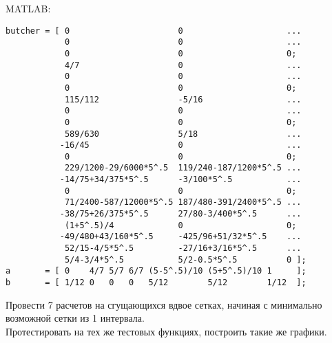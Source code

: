 \begin{enumerate}
\begin{verbatim}
\end{verbatim}
\newpage
MATLAB:
\begin{matlablisting}
	\begin{verbatim}
butcher = [ 0                      0                     ...
            0                      0                     ...
            0                      0                     0;
            4/7                    0                     ...
            0                      0                     ... 
            0                      0                     0;
            115/112                -5/16                 ...  
            0                      0                     ...
            0                      0                     0;
            589/630                5/18                  ...
           -16/45                  0                     ...
            0                      0                     0;
            229/1200-29/6000*5^.5  119/240-187/1200*5^.5 ...
           -14/75+34/375*5^.5      -3/100*5^.5           ...        
            0                      0                     0;
            71/2400-587/12000*5^.5 187/480-391/2400*5^.5 ...
           -38/75+26/375*5^.5      27/80-3/400*5^.5      ...
            (1+5^.5)/4             0                     0;
           -49/480+43/160*5^.5     -425/96+51/32*5^.5    ...   
            52/15-4/5*5^.5         -27/16+3/16*5^.5      ...
            5/4-3/4*5^.5           5/2-0.5*5^.5          0 ];
a       = [ 0    4/7 5/7 6/7 (5-5^.5)/10 (5+5^.5)/10 1     ];
b       = [ 1/12 0   0   0   5/12        5/12        1/12  ];
	\end{verbatim}
\end{matlablisting}

Провести 7 расчетов на сгущающихся вдвое сетках, начиная с минимально возможной сетки из 1 интервала.\\
Протестировать на тех же тестовых функциях, построить такие же графики.
\end{enumerate}
